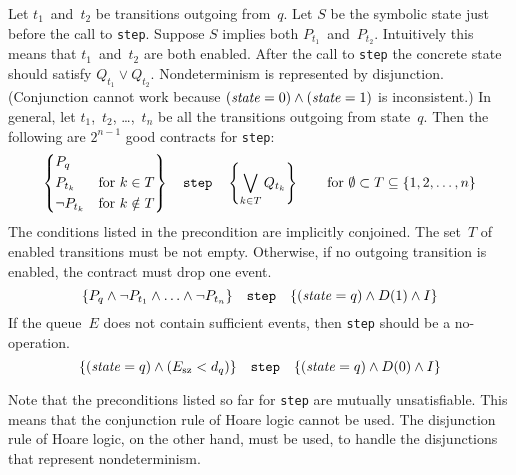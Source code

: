 \documentclass{article} %
\newcommand{\3}[3]{\{\,#1\,\}\;#2\;\{\,#3\,\}}
\renewcommand{\*}{\,*\,}
\begin{document}
Let $t_1$~and~$t_2$ be transitions outgoing from~$q$.
Let $S$ be the symbolic state just before the call to {\tt step}.
Suppose $S$ implies both $P_{t_1}$~and~$P_{t_2}$.
Intuitively this means that $t_1$~and~$t_2$ are both enabled.
After the call to {\tt step} the concrete state should satisfy $Q_{t_1}\lor Q_{t_2}$.
Nondeterminism is represented by disjunction.
(Conjunction cannot work because $({\it state}=0)\land({\it state}=1)$ is inconsistent.)
In general, let $t_1$,~$t_2$, \dots,~$t_n$ be all the transitions outgoing from state~$q$.
Then the following are $2^{n-1}$ good contracts for {\tt step}:
\[
  \left\{\begin{aligned}
  &P_q&&\\
  &P_{t_k}  &&\text{for $k\in T$} \\
  &\lnot P_{t_k}  &&\text{for $k\notin T$}
  \end{aligned}\right\}
  \quad\text{\tt step}\quad
  \left\{\bigvee_{k\in T}Q_{t_k}\right\}
  \qquad\text{for $\emptyset\subset T\subseteq \{1,2,\ldots,n\}$}
\]
The conditions listed in the precondition are implicitly conjoined.
The set~$T$ of enabled transitions must be not empty.
Otherwise, if no outgoing transition is enabled, the contract must drop one event.
\[
  \{P_q\land\lnot P_{t_1}\land\ldots\land\lnot P_{t_n}\}
  \quad\text{\tt step}\quad
  \{({\it state}=q)\land D(1)\land I\}
\]
If the queue~$E$ does not contain sufficient events, then {\tt step} should be a no-operation.
\[
  \{({\it state}=q)\land(E_{\rm sz}<d_q)\}
  \quad\text{\tt step}\quad
  \{({\it state}=q)\land D(0)\land I\}
\]

Note that the preconditions listed so far for {\tt step} are mutually unsatisfiable.
This means that the conjunction rule of Hoare logic cannot be used.
The disjunction rule of Hoare logic, on the other hand, must be used, to handle the disjunctions that represent nondeterminism.
\end{document}
